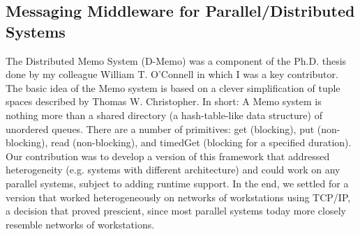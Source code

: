 \subsection{Messaging Middleware for Parallel/Distributed Systems}


\begin{refsection}
    \nocite{george_k._thiruvathukal_enhanced_1995}
    \nocite{george_k._thiruvathukal_simulation_1991}
    \nocite{george_k._thiruvathukal_toward_1994}
    \printbibliography[heading=none]
\end{refsection}



{
The Distributed Memo System (D-Memo) was a component of the Ph.D. thesis done by my colleague William T. O'Connell in which I was a key contributor. The basic idea of the Memo system is based on a clever simplification of tuple spaces described by Thomas W. Christopher. In short: A Memo system is nothing more than a shared directory (a hash-table-like data structure) of unordered queues. There are a number of primitives: get (blocking), put (non-blocking), read (non-blocking), and timedGet (blocking for a specified duration). Our contribution was to develop a version of this framework that addressed heterogeneity (e.g. systems with different architecture) and could work on any parallel systems, subject to adding runtime support. In the end, we settled for a version that worked heterogeneously on networks of workstations using TCP/IP, a decision that proved prescient, since most parallel systems today more closely resemble networks of workstations.
}

